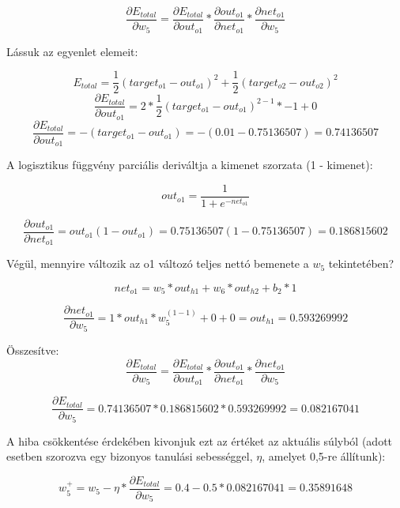 \[\frac{\partial E_{total}}{\partial w_{5}} = \frac{\partial E_{total}}{\partial out_{o1}} * \frac{\partial out_{o1}}{\partial net_{o1}} * \frac{\partial net_{o1}}{\partial w_{5}}\]

Lássuk az egyenlet elemeit:
\begin{flushleft}
\begin{equation}
E_{total} = \frac{1}{2}(target_{o1} - out_{o1})^{2} + \frac{1}{2}(target_{o2} - out_{o2})^{2}
\end{equation}
\begin{equation}
\frac{\partial E_{total}}{\partial out_{o1}} = 2 * \frac{1}{2}(target_{o1} - out_{o1})^{2 - 1} * -1 + 0
\end{equation}
\begin{equation}
\frac{\partial E_{total}}{\partial out_{o1}} = -(target_{o1} - out_{o1}) = -(0.01 - 0.75136507) = 0.74136507
\end{equation}

\end{flushleft}

A logisztikus függvény parciális deriváltja a kimenet szorzata (1 - kimenet):

\[out_{o1} = \frac{1}{1+e^{-net_{o1}}}\]

\[\frac{\partial out_{o1}}{\partial net_{o1}} = out_{o1}(1 - out_{o1}) = 0.75136507(1 - 0.75136507) = 0.186815602\]

Végül, mennyire változik az o1 változó teljes nettó bemenete a \(w_5\) tekintetében?

\[net_{o1} = w_5 * out_{h1} + w_6 * out_{h2} + b_2 * 1\]

\[\frac{\partial net_{o1}}{\partial w_{5}} = 1 * out_{h1} * w_5^{(1 - 1)} + 0 + 0 = out_{h1} = 0.593269992\]

Összesítve:\\

\[\frac{\partial E_{total}}{\partial w_{5}} = \frac{\partial E_{total}}{\partial out_{o1}} * \frac{\partial out_{o1}}{\partial net_{o1}} * \frac{\partial net_{o1}}{\partial w_{5}}\]

\[\frac{\partial E_{total}}{\partial w_{5}} = 0.74136507 * 0.186815602 * 0.593269992 = 0.082167041\]

A hiba csökkentése érdekében kivonjuk ezt az értéket az aktuális súlyból (adott esetben szorozva egy bizonyos tanulási sebességgel, $\eta$, amelyet 0,5-re állítunk):

\[w_5^{+} = w_5 - \eta * \frac{\partial E_{total}}{\partial w_{5}} = 0.4 - 0.5 * 0.082167041 = 0.35891648\]

